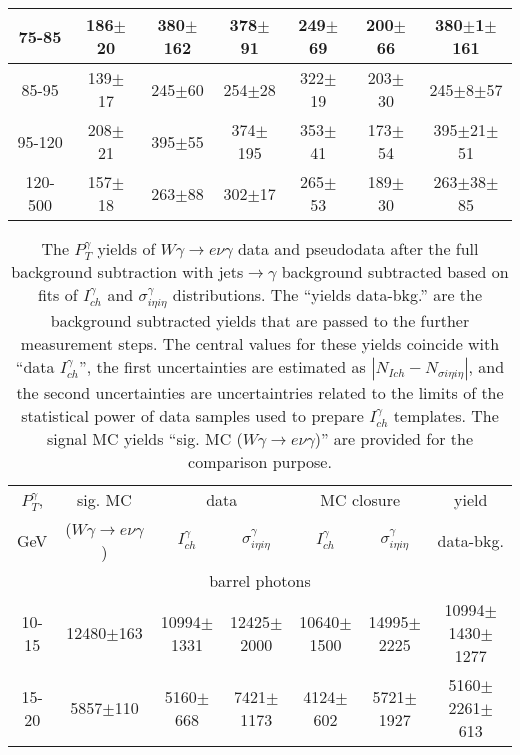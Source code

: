\begin{table}[h]
\begin{center}
\begin{tabular}{|c|c|c|c|c|c|c|}
    75-85 & 186$\pm$20 & 380$\pm$162 & 378$\pm$91 & 249$\pm$69 & 200$\pm$66 &380$\pm$1$\pm$161  \\ \hline
    85-95 & 139$\pm$17 & 245$\pm$60 & 254$\pm$28 & 322$\pm$19 & 203$\pm$30 &245$\pm$8$\pm$57  \\ \hline
    95-120 & 208$\pm$21 & 395$\pm$55 & 374$\pm$195 & 353$\pm$41 & 173$\pm$54 &395$\pm$21$\pm$51  \\ \hline
    120-500 & 157$\pm$18 & 263$\pm$88 & 302$\pm$17 & 265$\pm$53 & 189$\pm$30 &263$\pm$38$\pm$85  \\ \hline
  \end{tabular}
  \label{tab:diff_ways_to_fit_phoEt_muon}
  \end{center}
\end{table}

\begin{table}[h]
  \tiny
  \begin{center}
  \caption{The $P_T^{\gamma}$ yields of $W\gamma\rightarrow e\nu\gamma$ data and pseudodata after the full background subtraction with jets$\rightarrow\gamma$ background subtracted based on fits of $I_{ch}^{\gamma}$ and  $\sigma_{i\eta i\eta}^\gamma$ distributions. The ``yields data-bkg.'' are the background subtracted yields that are passed to the further measurement steps. The central values for these yields coincide with ``data $I_{ch}^{\gamma}$'', the first uncertainties are estimated as $|N_{Ich}-N_{\sigma i\eta i\eta}|$, and the second uncertainties are uncertaintries related to the limits of the statistical power of data samples used to prepare $I_{ch}^{\gamma}$ templates. The signal MC yields ``sig. MC ($W\gamma\rightarrow e\nu\gamma$)'' are provided for the comparison purpose.}
  \begin{tabular}{|c|c|c|c|c|c|c|}
    $P_T^{\gamma}$, &  sig. MC   & \multicolumn{2}{|c|}{data}  & \multicolumn{2}{|c|}{MC closure} & yield\\ 
    GeV & ($W\gamma\rightarrow e\nu\gamma$) & $I_{ch}^{\gamma}$ & $\sigma_{i\eta i\eta}^\gamma$  & $I_{ch}^{\gamma}$  & $\sigma_{i\eta i\eta}^\gamma$   & data-bkg. \\ \hline
    \multicolumn{7}{|c|}{barrel photons} \\ \hline
    10-15 & 12480$\pm$163 & 10994$\pm$1331 & 12425$\pm$2000 & 10640$\pm$1500 & 14995$\pm$2225 &10994$\pm$1430$\pm$1277  \\ \hline
    15-20 & 5857$\pm$110 & 5160$\pm$668 & 7421$\pm$1173 & 4124$\pm$602 & 5721$\pm$1927 &5160$\pm$2261$\pm$613  \\ \hline

\end{tabular}
\end{center}
\end{table}
